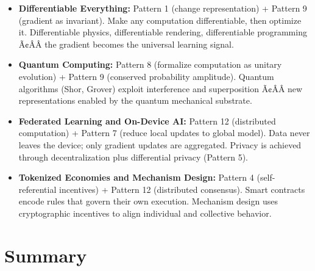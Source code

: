 \begin{itemize}
\item \textbf{Differentiable Everything:} Pattern 1 (change representation) + Pattern 9 (gradient as invariant). Make any computation differentiable, then optimize it. Differentiable physics, differentiable rendering, differentiable programming Ã¢ÂÂ the gradient becomes the universal learning signal.

\item \textbf{Quantum Computing:} Pattern 8 (formalize computation as unitary evolution) + Pattern 9 (conserved probability amplitude). Quantum algorithms (Shor, Grover) exploit interference and superposition Ã¢ÂÂ new representations enabled by the quantum mechanical substrate.

\item \textbf{Federated Learning and On-Device AI:} Pattern 12 (distributed computation) + Pattern 7 (reduce local updates to global model). Data never leaves the device; only gradient updates are aggregated. Privacy is achieved through decentralization plus differential privacy (Pattern 5).

\item \textbf{Tokenized Economies and Mechanism Design:} Pattern 4 (self-referential incentives) + Pattern 12 (distributed consensus). Smart contracts encode rules that govern their own execution. Mechanism design uses cryptographic incentives to align individual and collective behavior.
\end{itemize}

\section{Summary}
\label{sec:anatomy:summary}

